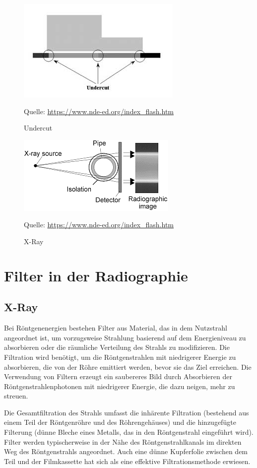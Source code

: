 \begin{figure}[htb]
  \centering 
 \includegraphics[scale=0.9]{img/Undercut.jpg}
 \caption{Undercut}
  \label{fig:Undercut}
  Quelle: \url{https://www.nde-ed.org/index_flash.htm}
\end{figure}
\begin{figure}[h]
   \centering
 \includegraphics[scale=0.5]{img/x-ray.png}
 \caption{X-Ray}
  \label{fig:gammaAndx-ray}
  \centering
  Quelle: \url{https://www.nde-ed.org/index_flash.htm}
\end{figure}

\section{Filter in der Radiographie}
\subsection{X-Ray}

Bei Röntgenenergien bestehen Filter aus Material, das in dem Nutzstrahl angeordnet ist, um vorzugsweise Strahlung basierend auf dem Energieniveau zu absorbieren oder die räumliche Verteilung des Strahls zu modifizieren. Die Filtration wird benötigt, um die Röntgenstrahlen mit niedrigerer Energie zu absorbieren, die von der Röhre emittiert werden, bevor sie das Ziel erreichen. Die Verwendung von Filtern erzeugt ein saubereres Bild durch Absorbieren der Röntgenstrahlenphotonen mit niedrigerer Energie, die dazu neigen, mehr zu streuen.

Die Gesamtfiltration des Strahls umfasst die inhärente Filtration (bestehend aus einem Teil der Röntgenröhre und des Röhrengehäuses) und die hinzugefügte Filterung (dünne Bleche eines Metalls, das in den Röntgenstrahl eingeführt wird). Filter werden typischerweise in der Nähe des Röntgenstrahlkanals im direkten Weg des Röntgenstrahls angeordnet. Auch eine dünne Kupferfolie zwischen dem Teil und der Filmkassette hat sich als eine effektive Filtrationsmethode erwiesen.

